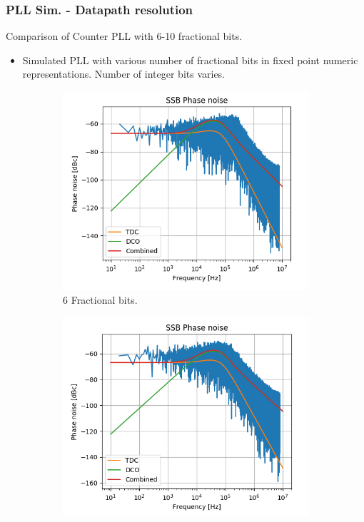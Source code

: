 \documentclass[t, screen, aspectratio=43]{beamer}
\begin{document}
\begin{frame}
	\frametitle{PLL Sim. - Datapath resolution}
	\begin{block}{Comparison of Counter PLL with 6-10 fractional bits.}
			\scriptsize
		\begin{itemize}
			\item Simulated PLL with various number of fractional bits in fixed point numeric representations. Number of integer bits varies.
		\end{itemize}

		\begin{figure}[htb!]
	        \centering
	        \begin{subfigure}{.33\textwidth}
	            \centering
	            \includegraphics[width=1\linewidth]{6bit_frac_pn.png}
	            \caption{\scriptsize 6 Fractional bits.}
	            \label{fig:rosc_3stg_cir}
	        \end{subfigure}%
	        \begin{subfigure}{.33\textwidth}
	            \centering
	            \includegraphics[width=1\linewidth]{8bit_frac_pn.png}

\end{subfigure}
\end{figure}
\end{block}
\end{frame}
\end{document}
